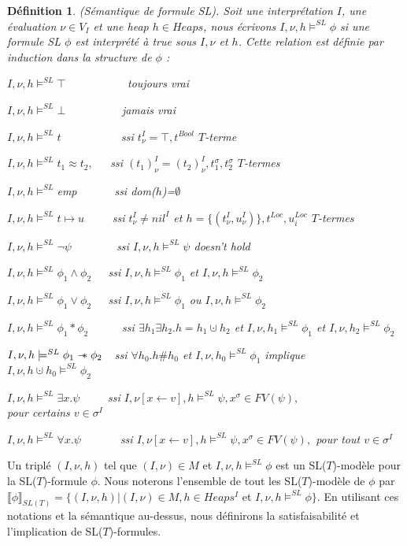 \documentclass[9pt]{book}
\newcommand\sepimp{\mathrel{-\mkern-6mu*}}
\newcommand\phibra{\llbracket\phi\rrbracket}
\newtheorem{definition}{D\'efinition}[section]
\begin{document}
	\begin{definition}
	(S\'emantique de formule SL). Soit une interpr\'etation $I$, une \'evaluation $\nu\in V_{I}$ et une heap $h\in Heaps$, nous \'ecrivons $I,\nu,h\models^{SL}\phi$ si une formule SL $\phi$ est interpr\'et\'e \`a true sous $I,\nu$ et $h$. Cette relation est d\'efinie par induction  dans la structure de $\phi$ :\par
	$I,\nu,h\models^{SL}\top$~~~~~~~~~~~toujours vrai\par
$I,\nu,h\models^{SL}\bot$~~~~~~~~~~jamais vrai\par
$I,\nu,h\models^{SL} t$~~~~~~~~~~ ssi $t^{I}_{\nu}=\top,t^{Bool}$ $T$-terme\par
$I,\nu,h\models^{SL} t_{1}\approx t_{2},$~~~ssi $(t_{1})^{I}_{\nu}=(t_{2})^{I}_{\nu},t^{\sigma}_{1},t^{\sigma}_{2}$ $T$-termes\par
$I,\nu,h\models^{SL}$emp ~~~~~~ssi dom($h$)=$\emptyset$\par
$I,\nu,h\models^{SL}t\mapsto u$~~~~~ssi $t^{I}_{\nu}\neq nil^{I}$ et $h = \{(t^{I}_{\nu},u^{I}_{\nu} )\}, t^{Loc}, u^{Loc}_{i}$ $T$-termes \par
$I,\nu,h\models^{SL}\neg\psi$~~~~~~~~ssi $I,\nu,h\models^{SL}\psi$ doesn't hold\par
$I,\nu,h\models^{SL}\phi_{1}\land\phi_{2}$~~~ssi $I,\nu,h\models^{SL}\phi_{1}$ et $I,\nu,h\models^{SL}\phi_{2}$\par
$I,\nu,h\models^{SL}\phi_{1}\lor\phi_{2}$~~~ssi $I,\nu,h\models^{SL}\phi_{1}$ ou $I,\nu,h\models^{SL}\phi_{2}$\par
$I,\nu,h\models^{SL}\phi_{1}*\phi_{2}$~~~~~~ssi $\exists h_{1}\exists h_{2}.h=h_{1}\cupdot h_{2}$ et $I,\nu,h_{1}\models^{SL}\phi_{1}$ et $I,\nu,h_{2}\models^{SL}\phi_{2}$\par
$I,\nu,h\models^{SL}\phi_{1}\sepimp\phi_{2}$~~ssi $\forall h_{0}.h\#h_{0}$ et $I,\nu,h_{0}\models^{SL}\phi_{1}$ implique \\$I,\nu,h\cupdot h_{0}\models^{SL}\phi_{2}$\par
$I,\nu,h\models^{SL}\exists x.\psi$~~~~~ssi $I,\nu[x\leftarrow v],h\models^{SL}\psi, x^{\sigma}\in FV(\psi),$ \\pour certains $v\in\sigma^{I}$\par
$I,\nu,h\models^{SL}\forall x.\psi$~~~~~~~ssi $I,\nu[x\leftarrow v],h\models^{SL}\psi, x^{\sigma}\in FV(\psi),$ pour tout $v\in\sigma^{I}$
	\end{definition}
	Un tripl\'e $(I,\nu,h)$ tel que $(I,\nu)\in M$ et $I,\nu,h\models^{SL}\phi$ est un SL($T$)-mod\`ele pour la SL($T$)-formule $\phi$. Nous noterons l'ensemble de tout les SL($T$)-mod\`ele de $\phi$ par $\phibra_{SL(T)} = \{(I,\nu,h)|(I,\nu)\in M,h\in Heaps^{I}$ et $I,\nu,h\models^{SL}\phi\}$. En utilisant ces notations et la s\'emantique au-dessus, nous d\'efinirons la satisfaisabilit\'e et l'implication de SL($T$)-formules.
\end{document}
